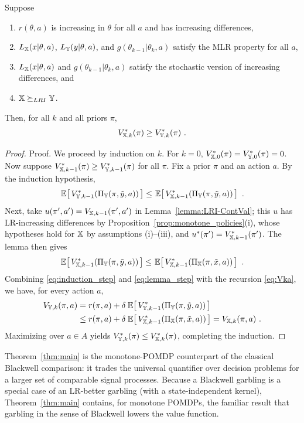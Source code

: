 \begin{theorem}\label{thm:main}
Suppose
\begin{enumerate}
\item $r(\theta,a)$ is increasing in $\theta$ for all $a$ and has
  increasing differences,
\item $L_{\mathbb{X}}(x|\theta,a)$, $L_{\mathbb{Y}}(y|\theta,a)$, and
  $g(\theta_{k-1}|\theta_k,a)$ satisfy the MLR property for all $a$,
\item $L_{\mathbb{X}}(x|\theta,a)$ and $g(\theta_{k-1}|\theta_k,a)$ satisfy the
  stochastic version of increasing differences, and
\item ${\mathbb{X}} \succeq_{LRI} {\mathbb{Y}}$.
\end{enumerate}
Then, for all $k$ and all priors $\pi$,
\begin{equation}
V_{{\mathbb{X}},k}^*(\pi) \geq V_{{\mathbb{Y}},k}^*(\pi) \ . \label{eq:main_result}
\end{equation}
\end{theorem}

\begin{proof}{Proof.}
We proceed by induction on $k$. For $k=0$,
$V_{{\mathbb{X}},0}^*(\pi) = V_{{\mathbb{Y}},0}^*(\pi) = 0$. Now suppose
$V_{{\mathbb{X}},k-1}^*(\pi) \geq V_{{\mathbb{Y}},k-1}^*(\pi)$ for all $\pi$. Fix a
prior $\pi$ and an action $a$. By the induction hypothesis,
\begin{equation}
\ev{V_{\iY,k-1}^*(\Pi_\iY(\pi,\tilde{y},a))} \leq
\ev{V_{\iX,k-1}^*(\Pi_\iY(\pi,\tilde{y},a))} \ .
\label{eq:induction_step}
\end{equation}
Next, take $u(\pi',a') = V_{{\mathbb{X}},k-1}(\pi',a')$ in
Lemma~\ref{lemma:LRI-ContVal}; this $u$ has LR-increasing differences
by Proposition~\ref{prop:monotone_policies}(i), whose hypotheses hold
for ${\mathbb{X}}$ by assumptions (i)--(iii), and
$u^*(\pi') = V_{{\mathbb{X}},k-1}^*(\pi')$. The lemma then gives
\begin{equation}
\ev{V_{\iX,k-1}^*(\Pi_\iY(\pi,\tilde{y},a))} \leq
\ev{V_{\iX,k-1}^*(\Pi_\iX(\pi,\tilde{x},a))} \ .
\label{eq:lemma_step}
\end{equation}
Combining \eqref{eq:induction_step} and \eqref{eq:lemma_step} with the
recursion \eqref{eq:Vka}, we have, for every action $a$,
\begin{align}
V_{\iY,k}(\pi,a)
&= r(\pi,a) + \delta\, \ev{V_{\iY,k-1}^*(\Pi_\iY(\pi,\tilde{y},a))}
  \notag\\
&\leq r(\pi,a) + \delta\, \ev{V_{\iX,k-1}^*(\Pi_\iX(\pi,\tilde{x},a))}
  = V_{\iX,k}(\pi,a) \ .
\end{align}
Maximizing over $a \in A$ yields
$V_{{\mathbb{Y}},k}^*(\pi) \leq V_{{\mathbb{X}},k}^*(\pi)$, completing the induction.
\Halmos
\end{proof}

Theorem~\ref{thm:main} is the monotone-POMDP counterpart of the
classical Blackwell comparison: it trades the universal quantifier over
decision problems for a larger set of comparable signal processes.
Because a Blackwell garbling is a special case of an LR-better garbling
(with a state-independent kernel), Theorem~\ref{thm:main} contains, for
monotone POMDPs, the familiar result that garbling in the sense of
Blackwell lowers the value function.
